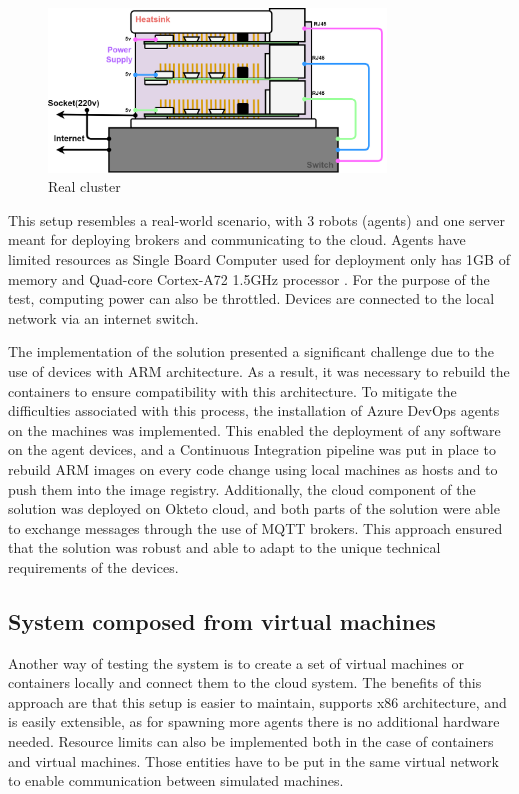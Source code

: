 \begin{figure}[H]
    \centering
    \includegraphics[width=0.8\textwidth]{pictures/cluster.png}
    \caption{Real cluster}
    \label{fig:cluster}
\end{figure}

This setup resembles a real-world scenario, with 3 robots (agents) and one server meant for deploying brokers and communicating to the cloud. Agents have limited resources as Single Board Computer used for deployment only has 1GB of memory and Quad-core Cortex-A72 1.5GHz processor \cite{rpi_specs}. For the purpose of the test, computing power can also be throttled. Devices are connected to the local network via an internet switch. 

The implementation of the solution presented a significant challenge due to the use of devices with ARM architecture. As a result, it was necessary to rebuild the containers to ensure compatibility with this architecture. To mitigate the difficulties associated with this process, the installation of Azure DevOps agents on the machines was implemented. This enabled the deployment of any software on the agent devices, and a Continuous Integration pipeline was put in place to rebuild ARM images on every code change using local machines as hosts and to push them into the image registry. Additionally, the cloud component of the solution was deployed on Okteto cloud, and both parts of the solution were able to exchange messages through the use of MQTT brokers. This approach ensured that the solution was robust and able to adapt to the unique technical requirements of the devices.

\subsection{System composed from virtual machines}
Another way of testing the system is to create a set of virtual machines or containers locally and connect them to the cloud system. The benefits of this approach are that this setup is easier to maintain, supports x86 architecture, and is easily extensible, as for spawning more agents there is no additional hardware needed. Resource limits can also be implemented both in the case of containers and virtual machines. Those entities have to be put in the same virtual network to enable communication between simulated machines.